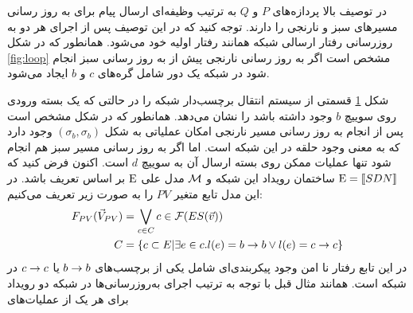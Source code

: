 در توصیف بالا پردازه‌های
$P$
و
$Q$
به ترتیب وظیفه‌ای ارسال پیام برای به روز رسانی مسیر‌های سبز و نارنجی را دارند.
توجه کنید که در این توصیف پس از اجرای هر دو به روزرسانی رفتار ارسالی شبکه همانند رفتار اولیه خود می‌شود.
همانطور که در شکل
\ref{fig:loop}
مشخص است اگر به روز رسانی نارنجی پیش از به روز رسانی سبز انجام شود در شبکه یک دور شامل گره‌های
$c$
و
$b$
ایجاد می‌شود.
\begin{figure}
    \centering
    \caption{}
    \label{fig:loop:lts}
\end{figure}
شکل
\ref{fig:loop:lts}
قسمتی از سیستم انتقال برچسب‌دار شبکه را در حالتی که یک بسته ورودی روی سوییچ
$b$
وجود داشته باشد را نشان می‌دهد.
همانطور که در شکل مشخص است پس از انجام به روز رسانی مسیر نارنجی امکان عملیاتی به شکل
$(\sigma_b,\sigma_b)$
وجود دارد که به معنی وجود حلقه در این شبکه است.
اما اگر به روز رسانی مسیر سبز هم انجام شود تنها عملیات ممکن روی بسته ارسال آن به سوییچ
$d$
است.
اکنون فرض کنید که
$\mathrm{E} = \llbracket SDN \rrbracket$
ساختمان رویداد این شبکه و
$\mathcal{M}$
مدل علی
$\mathrm{E}$
بر اساس تعریف
باشد.
در این مدل تابع متغیر
$PV$
را به صورت زیر تعریف می‌کنیم:
\begin{align*}
    F_{PV}(\vec V_{PV}) & = \bigvee_{c \in C} c \in \mathcal{F}(ES(\vec v)) \\
    C      & = \{c \subset E | \exists e \in c.
        l(e) = b\rightarrow b \vee l(e) = c\rightarrow c \}
\end{align*}
در این تابع رفتار نا امن وجود پیکربندی‌ای شامل یکی از برچسب‌های
$b \rightarrow b$
یا
$c \rightarrow c$
در شبکه است.
همانند مثال قبل با توجه به ترتیب اجرای به‌روز‌رسانی‌ها در شبکه دو رویداد برای هر یک از عملیات‌های
